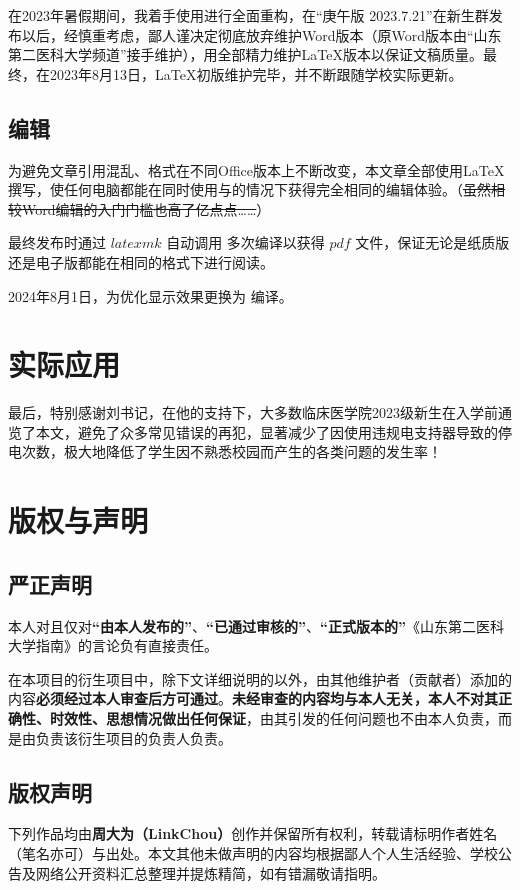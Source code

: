 在2023年暑假期间，我着手使用\XeLaTeX 进行全面重构，在“庚午版 2023.7.21”在新生群发布以后，经慎重考虑，鄙人谨决定彻底放弃维护Word版本（原Word版本由“山东第二医科大学频道”接手维护），用全部精力维护LaTeX版本以保证文稿质量。最终，在2023年8月13日，LaTeX初版维护完毕，并不断跟随学校实际更新。

\subsection[编辑]{编辑}
为避免文章引用混乱、格式在不同Office版本上不断改变，本文章全部使用\LaTeX 撰写，使任何电脑都能在同时使用与\footnotemark 的情况下获得完全相同的编辑体验。（\st{虽然相较Word编辑的入门门槛也高了亿点点……}）

最终发布时通过 $latexmk$ 自动调用 \XeTeX 多次编译以获得 $pdf$ 文件，保证无论是纸质版还是电子版都能在相同的格式下进行阅读。

2024年8月1日，为优化显示效果更换为 \LuaTeX 编译。

\section[实际应用]{实际应用}
最后，特别感谢刘书记，在他的支持下，大多数临床医学院2023级新生在入学前通览了本文，避免了众多常见错误的再犯，显著减少了因使用违规电支持器导致的停电次数，极大地降低了学生因不熟悉校园而产生的各类问题的发生率！

\section[版权与声明]{版权与声明}
\subsection[严正声明]{严正声明}
本人对且仅对\textbf{“由本人发布的”}、\textbf{“已通过审核的”}、\textbf{“正式版本的”}《山东第二医科大学指南》的言论负有直接责任。

在本项目的衍生项目中，除下文详细说明的以外，由其他维护者（贡献者）添加的内容\textbf{必须经过本人审查后方可通过}。\textbf{未经审查的内容均与本人无关，本人不对其正确性、时效性、思想情况做出任何保证}，由其引发的任何问题也不由本人负责，而是由负责该衍生项目的负责人负责。

\label{copyright}
\subsection[版权声明]{版权声明}
下列作品均由\textbf{周大为（LinkChou）}创作并保留所有权利，转载请标明作者姓名（笔名亦可）与出处。本文其他未做声明的内容均根据鄙人个人生活经验、学校公告及网络公开资料汇总整理并提炼精简，如有错漏敬请指明。

